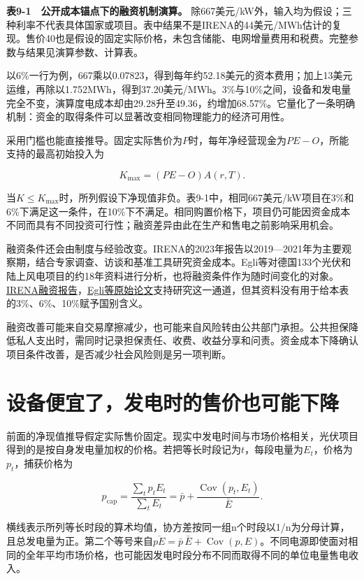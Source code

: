 \documentclass[UTF8,fontset=windows,12pt,a4paper,oneside,openany]{ctexbook}
\begin{document}
\textbf{表9-1　公开成本锚点下的融资机制演算。} 除667美元/kW外，输入均为假设；三种利率不代表具体国家或项目。表中结果不是IRENA的44美元/MWh估计的复现。售价40也是假设的固定实际价格，未包含储能、电网增量费用和税费。完整参数与结果见演算参数、计算表。

以6\%一行为例，667乘以0.07823，得到每年约52.18美元的资本费用；加上13美元运维，再除以1.752MWh，得到37.20美元/MWh。3\%与10\%之间，设备和发电量完全不变，演算度电成本却由29.28升至49.36，约增加68.57\%。它量化了一条明确机制：资金的取得条件可以显著改变相同物理能力的经济可用性。

采用门槛也能直接推导。固定实际售价为\(P\)时，每年净经营现金为\(PE-O\)，所能支持的最高初始投入为

\[
K_{\max}=(PE-O)A(r,T).
\tag{9-5}
\]

当\(K\leq K_{\max}\)时，所列假设下净现值非负。表9-1中，相同667美元/kW项目在3\%和6\%下满足这一条件，在10\%下不满足。相同购置价格下，项目仍可能因资金成本不同而具有不同投资可行性；融资差异由此在生产和售电之前影响采用机会。

融资条件还会由制度与经验改变。IRENA的2023年报告以2019—2021年为主要观察期，结合专家调查、访谈和基准工具研究资金成本。Egli等对德国133个光伏和陆上风电项目的约18年资料进行分析，也将融资条件作为随时间变化的对象。\href{https://www.irena.org/-/media/Files/IRENA/Agency/Publication/2023/May/IRENA_The_cost_of_financing_renewable_power_2023.pdf}{IRENA融资报告}，\href{https://www.nature.com/articles/s41560-018-0277-y?error=cookies_not_supported}{Egli等原始论文}支持研究这一通道，但其资料没有用于给本表的3\%、6\%、10\%赋予国别含义。

融资改善可能来自交易摩擦减少，也可能来自风险转由公共部门承担。公共担保降低私人支出时，需同时记录担保责任、收费、收益分享和问责。资金成本下降确认项目条件改善，是否减少社会风险则是另一项判断。

\section{设备便宜了，发电时的售价也可能下降}

前面的净现值推导假定实际售价固定。现实中发电时间与市场价格相关，光伏项目得到的是按自身发电量加权的价格。若把等长时段记为\(t\)，每段电量为\(E_t\)，价格为\(p_t\)，捕获价格为

\[
p_{\mathrm{cap}}=\frac{\sum_t p_tE_t}{\sum_t E_t}
=\bar p+\frac{\operatorname{Cov}(p_t,E_t)}{\bar E}.
\tag{9-6}
\]

横线表示所列等长时段的算术均值，协方差按同一组n个时段以1/n为分母计算，且总发电量为正。第二个等号来自\(\overline{pE}=\bar p\,\bar E+\operatorname{Cov}(p,E)\)。不同电源即使面对相同的全年平均市场价格，也可能因发电时段分布不同而取得不同的单位电量售电收入。
\end{document}
